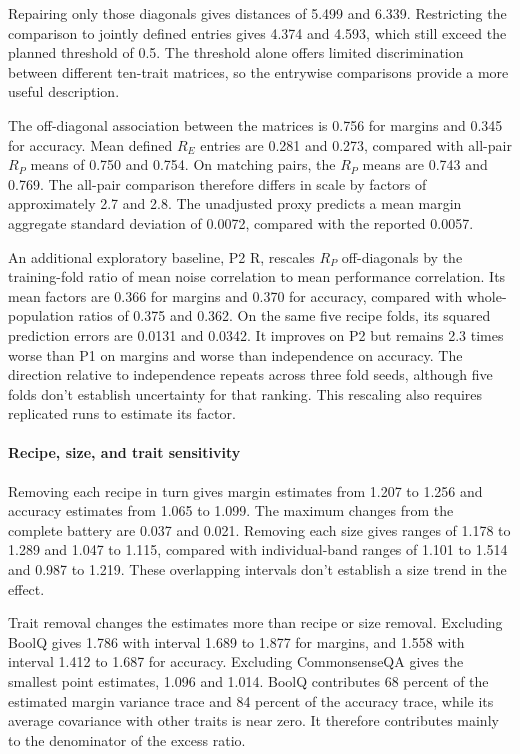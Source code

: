 Repairing only those diagonals gives distances of 5.499 and 6.339. Restricting the comparison to jointly defined entries gives 4.374 and 4.593, which still exceed the planned threshold of 0.5. The threshold alone offers limited discrimination between different ten-trait matrices, so the entrywise comparisons provide a more useful description.

The off-diagonal association between the matrices is 0.756 for margins and 0.345 for accuracy. Mean defined $R_E$ entries are 0.281 and 0.273, compared with all-pair $R_P$ means of 0.750 and 0.754. On matching pairs, the $R_P$ means are 0.743 and 0.769. The all-pair comparison therefore differs in scale by factors of approximately 2.7 and 2.8. The unadjusted proxy predicts a mean margin aggregate standard deviation of 0.0072, compared with the reported 0.0057.

An additional exploratory baseline, P2 R, rescales $R_P$ off-diagonals by the training-fold ratio of mean noise correlation to mean performance correlation. Its mean factors are 0.366 for margins and 0.370 for accuracy, compared with whole-population ratios of 0.375 and 0.362. On the same five recipe folds, its squared prediction errors are 0.0131 and 0.0342. It improves on P2 but remains 2.3 times worse than P1 on margins and worse than independence on accuracy. The direction relative to independence repeats across three fold seeds, although five folds don't establish uncertainty for that ranking. This rescaling also requires replicated runs to estimate its factor.

\paragraph{Recipe, size, and trait sensitivity}
Removing each recipe in turn gives margin estimates from 1.207 to 1.256 and accuracy estimates from 1.065 to 1.099. The maximum changes from the complete battery are 0.037 and 0.021. Removing each size gives ranges of 1.178 to 1.289 and 1.047 to 1.115, compared with individual-band ranges of 1.101 to 1.514 and 0.987 to 1.219. These overlapping intervals don't establish a size trend in the effect.

Trait removal changes the estimates more than recipe or size removal. Excluding BoolQ gives 1.786 with interval 1.689 to 1.877 for margins, and 1.558 with interval 1.412 to 1.687 for accuracy. Excluding CommonsenseQA gives the smallest point estimates, 1.096 and 1.014. BoolQ contributes 68 percent of the estimated margin variance trace and 84 percent of the accuracy trace, while its average covariance with other traits is near zero. It therefore contributes mainly to the denominator of the excess ratio.

